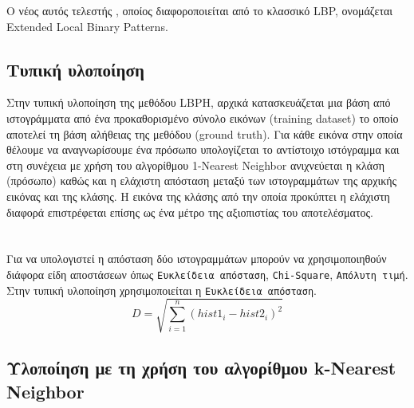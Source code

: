O νέος αυτός τελεστής , οποίος διαφοροποιείται από το κλασσικό LBP, ονομάζεται
Extended Local Binary Patterns.

\subsection{Τυπική υλοποίηση}\label{subsec:lbphdef}

Στην τυπική υλοποίηση της μεθόδου LBPH, αρχικά κατασκευάζεται μια βάση από ιστογράμματα
από ένα προκαθορισμένο σύνολο εικόνων (training dataset) το οποίο αποτελεί τη βάση
αλήθειας της μεθόδου (ground truth). Για κάθε εικόνα στην οποία θέλουμε να αναγνωρίσουμε ένα
πρόσωπο υπολογίζεται το αντίστοιχο ιστόγραμμα και στη συνέχεια με χρήση του αλγορίθμου
1-Nearest Neighbor 
ανιχνεύεται η κλάση (πρόσωπο) καθώς και η ελάχιστη απόσταση μεταξύ των
ιστογραμμάτων της αρχικής εικόνας και της κλάσης. Η εικόνα της κλάσης από την οποία
προκύπτει η ελάχιστη διαφορά επιστρέφεται επίσης ως ένα μέτρο της αξιοπιστίας του αποτελέσματος.
\paragraph{} \hspace{0em} \\
Για να υπολογιστεί η απόσταση δύο ιστογραμμάτων μπορούν να χρησιμοποιηθούν
διάφορα είδη αποστάσεων όπως \texttt{Ευκλείδεια απόσταση}, \texttt{Chi-Square},
\texttt{Απόλυτη τιμή}. Στην τυπική υλοποίηση χρησιμοποιείται η \texttt{Ευκλείδεια απόσταση}.
$$
D = \sqrt{\sum_{i=1}^{n}(hist1_i - hist2_i)^2}
$$

\subsection{Υλοποίηση με τη χρήση του αλγορίθμου k-Nearest Neighbor}\label{subsec:lbphknn}

